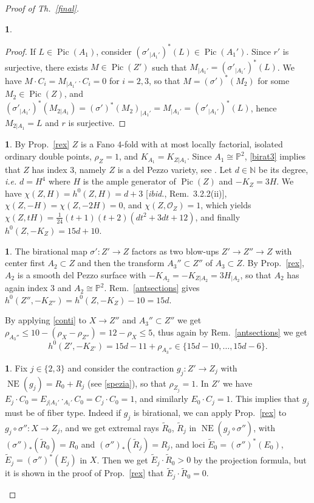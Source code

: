 \documentclass[a4paper,12pt]{amsart}
\theoremstyle{definition}
\newtheorem{prg}[thm]{}
\numberwithin{figure}{section}
\numberwithin{table}{section}
\newcommand{\w}{\widetilde}
\newcommand{\ol}{\mathcal{O}}
\newcommand{\pr}{\mathbb{P}}
\newcommand{\Pic}{\operatorname{Pic}}
\newcommand{\NE}{\operatorname{NE}}
\begin{document}
\begin{proof}[Proof of Th.~\ref{final}]
\begin{prg}
\begin{proof}
If $L\in\Pic(A_1)$, consider $(\sigma'_{|A_1'})^*(L)\in\Pic(A_1')$. Since $r'$ is surjective, there exists $M\in\Pic(Z')$ such that $M_{|A_1'}=(\sigma'_{|A_1'})^*(L)$. We have $M\cdot C_i=M_{|A_1'}\cdot C_i=0$ for $i=2,3$, so that $M=(\sigma')^*(M_2)$ for some $M_2\in\Pic(Z)$, and
$(\sigma'_{|A_1'})^*(M_{2|A_1})=(\sigma')^*(M_2)_{|A_1'}=M_{|A_1'}=(\sigma'_{|A_1'})^*(L)$, hence
$M_{2|A_1}=L$ and $r$ is surjective.
\end{proof}
\end{prg}
\begin{prg}\label{Z}
  By Prop.~\ref{rex} $Z$ is a Fano $4$-fold with at most locally factorial, isolated ordinary double points, $\rho_Z=1$, and $K_{A_1}=K_{Z|A_1}$. Since $A_1\cong\pr^2$, \ref{birat3} implies that
   $Z$ has index $3$, namely 
 $Z$ is a del Pezzo variety, see \cite[\S 3.2]{fanoEMS}. Let $d\in\mathbb{N}$ be its degree, \emph{i.e.} $d=H^4$ where $H$ is the ample generator of $\Pic(Z)$ and $-K_Z=3H$. We have $\chi(Z,H)=h^0(Z,H)=d+3$ [\emph{ibid.}, Rem.~3.2.2(ii)], $\chi(Z,-H)=\chi(Z,-2H)=0$, and $\chi(Z,\ol_Z)=1$, which yields $\chi(Z,tH)=\frac{1}{24}(t+1)(t+2)(dt^2+3dt+12)$, and finally $h^0(Z,-K_Z)=15 d+10$.
\end{prg}
\begin{prg}\label{Z'}
  The birational map $\sigma'\colon Z'\to Z$ factors as two blow-ups $Z'\to Z''\to Z$ with center first $A_2\subset Z$ and then the transform $A_3''\subset Z''$ of $A_3\subset Z$. By Prop.~\ref{rex}, $A_2$ is a smooth del Pezzo surface with $-K_{A_2}=-K_{Z|A_2}=3H_{|A_2}$, so that $A_2$ has again index $3$ and $A_2\cong\pr^2$.  Rem.~\ref{antsections} gives 
    $h^0(Z'',-K_{Z''})=h^0(Z,-K_Z)-10=15d$.
    
By applying \eqref{conti} to $X\to Z''$ and $A_3''\subset Z''$ we get $\rho_{A_3''}\leq 10-(\rho_X-\rho_{Z''})=12-\rho_X\leq 5$, thus 
again by Rem.~\ref{antsections} we get
  \begin{equation}\label{Z'formula}
    h^0(Z',-K_{Z'})=15d-11+\rho_{A_3''}\in\{15d-10,\dotsc,15d-6\}.
    \end{equation}
\end{prg}
\begin{prg}\label{WW}
  Fix $j\in\{2,3\}$ and consider the contraction $g_j\colon Z'\to Z_j$ with $\NE(g_j)=R_0+R_j$ (see \ref{spezia}), so that $\rho_{Z_j}=1$. In $Z'$ we have $E_{j}\cdot C_0=E_{j|A_1'}\cdot_{A_1'} C_0=C_j\cdot C_0=1$, and similarly $E_{0}\cdot C_j=1$. This implies that $g_j$ must be of fiber type. Indeed if $g_j$ is birational, we can apply Prop.~\ref{rex} to $g_j\circ\sigma''\colon X\to Z_j$, and we get extremal rays $\w{R}_0$, $\w{R}_j$ in $\NE(g_j\circ\sigma'')$, with $(\sigma'')_*(\w{R}_0)=R_0$ and   $(\sigma'')_*(\w{R}_j)=R_j$, and loci $\w{E}_0=(\sigma'')^*(E_0)$, $\w{E}_j=(\sigma'')^*(E_j)$ in $X$. Then we get $\w{E}_j\cdot\w{R}_0>0$ by the projection formula, but it is shown in the proof of Prop.~\ref{rex} that $\w{E}_j\cdot\w{R}_0=0$. 


\end{prg}
\end{proof}
\end{document}
